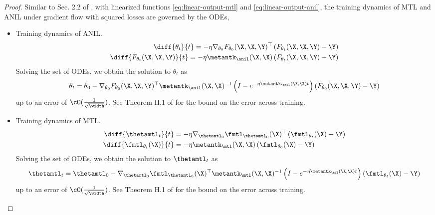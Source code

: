 \documentclass{article}
\begin{document}
\begin{proof}
Similar to Sec. 2.2 of \citet{lee2019wide}, with linearized functions \eqref{eq:linear-output-mtl} and \eqref{eq:linear-output-anil}, the training dynamics of MTL and ANIL under gradient flow with squared losses are governed by the ODEs,
\begin{itemize}
    \item Training dynamics of ANIL.
    \begin{align}
        \diff{\theta_t}{t} = -\eta \nabla_{\theta_0} F_{\theta_0}(\X,\X,\Y)^\top \left(F_{\theta_t}(\X,\X,\Y) - \Y\right) \\
        \diff{F_{\theta_t}(\X,\X,\Y)}{t} = -\eta \metantk_\anil(\X,\X) \left(F_{\theta_t}(\X,\X,\Y) - \Y\right) 
    \end{align}
    Solving the set of ODEs, we obtain the solution to $\theta_t$ as 
    \begin{align}
        \theta_t = \theta_0 - \nabla_{\theta_0} F_{\theta_0}(\X,\X,\Y)^\top \metantk_\anil(\X,\X)^{-1} \left(I - e^{-\eta \metantk_\anil(\X,\X)t }\right)  \left(F_{\theta_0}(\X,\X,\Y) - \Y\right)
    \end{align}
    up to an error of $\cO(\frac{1}{\sqrt{\width}})$. See Theorem H.1 of \citet{lee2019wide} for the bound on the error across training.
     \item Training dynamics of MTL.
    \begin{align}
        \diff{\thetamtl_t}{t} &= -\eta \nabla_{\thetamtl_0} \fmtl_{\thetamtl_0}(\X)^\top \left(\fmtl_{\theta_t}(\X) - \Y\right)\\
        \diff{\fmtl_{\theta_t}(\X)}{t}&= -\eta \metantk_\mtl(\X,\X) \left(\fmtl_{\theta_0}(\X) - \Y\right)
    \end{align}
    Solving the set of ODEs, we obtain the solution to $\thetamtl_t$ as
    \begin{align}
        \thetamtl_t = \thetamtl_0 - \nabla_{\thetamtl_0} \fmtl_{\thetamtl_0}(\X)^\top \metantk_\mtl(\X,\X)^{-1} \left(I - e^{-\eta \metantk_\mtl(\X,\X)t }\right)  \left(\fmtl_{\theta_t}(\X) - \Y\right)
    \end{align}
    up to an error of $\cO(\frac{1}{\sqrt{\width}})$. See Theorem H.1 of \citet{lee2019wide} for the bound on the error across training.
    
\end{itemize}


\end{proof}
\end{document}
